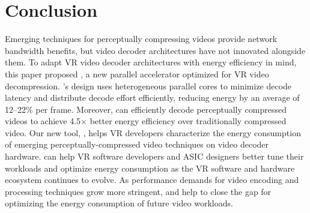 \section{Conclusion}
Emerging techniques for perceptually compressing videos provide network bandwidth benefits, but video decoder architectures have not innovated alongside them.
To adapt VR video decoder architectures with energy efficiency in mind, this paper proposed \nameArch, a new parallel accelerator optimized for VR video decompression.
\nameArch's design uses heterogeneous parallel cores to minimize decode latency and distribute decode effort efficiently, reducing energy by an average of 12--22\% per frame.
Moreover, \nameArch can efficiently decode perceptually compressed videos to achieve 4.5$\times$ better energy efficiency over traditionally compressed video.
Our new tool, \nameArchprof, helps VR developers characterize the energy consumption of emerging perceptually-compressed video techniques on video decoder hardware.
\nameArchprof can help VR software developers and ASIC designers better tune their workloads and optimize energy consumption as the VR software and hardware ecosystem continues to evolve.
As performance demands for video encoding and processing techniques grow more stringent, \nameArch and \nameArchprof help to close the gap for optimizing the energy consumption of future video workloads.
